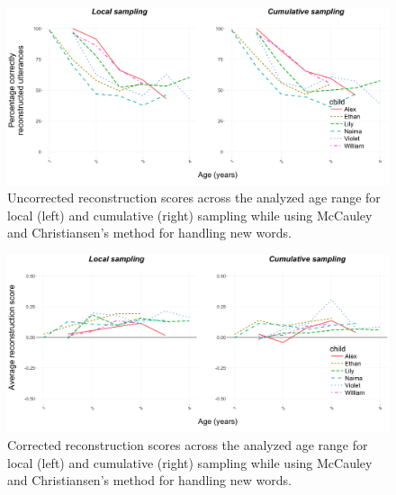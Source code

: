 \documentclass{article}
\begin{document}
\begin{figure}
\centering
\includegraphics[width=\textwidth]{images/suppl_bothreconperc.png} 
\caption{Uncorrected reconstruction scores across the analyzed age range for local (left) and cumulative (right) sampling while using McCauley and Christiansen's method for handling new words.}
\label{fig:suppl_recon_percentage}
\end{figure}

\begin{figure}
\centering
\includegraphics[width=\textwidth]{images/suppl_bothreconscore.png} 
\caption{Corrected reconstruction scores across the analyzed age range for local (left) and cumulative (right) sampling while using McCauley and Christiansen's method for handling new words.}
\label{fig:suppl_recon_score}
\end{figure}

\end{document}

